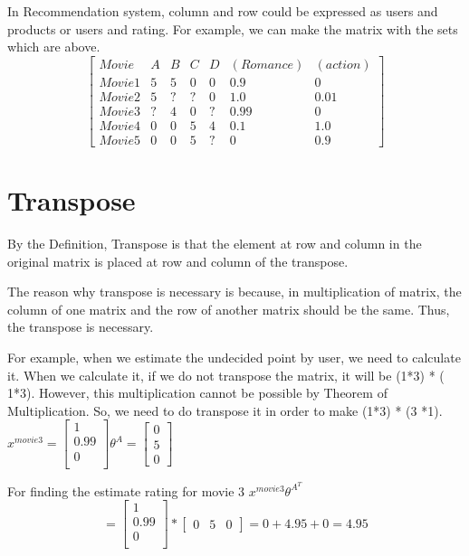 \documentclass[paper=a4, fontsize=11pt]{scrartcl} %
\numberwithin{equation}{section} %
\numberwithin{figure}{section} %
\numberwithin{table}{section} %
\begin{document}
\bigskip
In Recommendation system, column and row could be expressed as users and products or users and rating. For example, we can make the matrix with the sets which are above.
\[
\begin{bmatrix}
Movie & A & B & C & D & (Romance) & (action) \\
Movie1 & 5 & 5 & 0 & 0 & 0.9 & 0 \\
Movie2 & 5 & ? & ? & 0 & 1.0 & 0.01\\
Movie3 & ? & 4 & 0 & ? & 0.99 & 0 \\
Movie4 & 0 & 0 & 5 & 4 & 0.1 & 1.0 \\
Movie5 & 0 & 0 & 5 & ? & 0 & 0.9
\end{bmatrix}
\]
\bigskip
\section{Transpose}

By the Definition, Transpose is that the element at row and column in the original matrix is placed at row and column of the transpose.



The reason why transpose is necessary is because, in multiplication of matrix, the column of one matrix and the row of another matrix should be the same. Thus, the transpose is necessary.



For example, when we estimate the undecided point by user, we need to calculate it. When we calculate it, if we do not transpose the matrix, it will be (1*3) * ( 1*3). However, this multiplication cannot be possible by Theorem of Multiplication. So, we need to do transpose it in order to make (1*3) * (3 *1).
\(
x^{movie 3} =
\begin{bmatrix}
1\\0.99\\0\\
\end{bmatrix}
\theta ^{A} = \begin{bmatrix}
0 \\ 5 \\ 0
\end{bmatrix}
\)

For finding the estimate rating for movie 3
\(x^{movie3} \theta ^{A^T}\)
\[
=
\begin{bmatrix}
1\\0.99\\0\\
\end{bmatrix}
*
\begin{bmatrix}
0 & 5 & 0
\end{bmatrix}
=
0 + 4.95 + 0 = 4.95
\]
\end{document}
